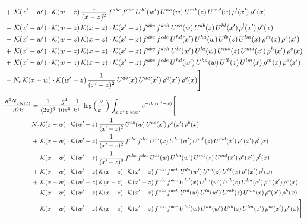 \documentclass[9pt]{article}
\numberwithin{equation}{section}
\begin{document}
\begin{align}
&+\,\mathcal{K}(x'-w')\cdot\mathcal{K}(w-z)\,\frac{1}{(x-z)^{2}}\,f^{abc}\,f^{cde}\,U^{hl}(w')\,U^{ha}(w)\,U^{mb}(z)\,U^{md}(x)\,\rho^{l}(x')\,\rho^{e}(x)\notag\\
&-\,\mathcal{K}(x'-w')\cdot\mathcal{K}(w-z)\,\mathcal{K}(x-z)\cdot\mathcal{K}(x'-z)\,f^{abc}\,f^{deh}\,U^{ea}(w)\,U^{db}(z)\,U^{hl}(x')\,\rho^{l}(x')\,\rho^{c}(x)\notag\\
&-\,\mathcal{K}(x'-w')\cdot\mathcal{K}(w-z)\,\mathcal{K}(x-z)\cdot\mathcal{K}(x'-z)\,f^{abc}\,f^{cde}\,U^{hd}(x')\,U^{ha}(w)\,U^{lb}(z)\,U^{lm}(x)\,\rho^{m}(x)\,\rho^{e}(x')\notag\\
&+\,\mathcal{K}(x'-w')\cdot\mathcal{K}(w-z)\,\mathcal{K}(x-z)\cdot\mathcal{K}(x'-z)\,f^{abc}\,f^{deh}\,U^{le}(w')\,U^{la}(w)\,U^{mb}(z)\,U^{md}(x')\,\rho^{h}(x')\,\rho^{c}(x)\notag\\
&+\,\mathcal{K}(x'-w')\cdot\mathcal{K}(w-z)\,\mathcal{K}(x-z)\cdot\mathcal{K}(x'-z)\,f^{abc}\,f^{cde}\,U^{hd}(w')\,U^{ha}(w)\,U^{lb}(z)\,U^{lm}(x)\,\rho^{m}(x)\,\rho^{e}(x')\notag\\
&-N_{c}\,\mathcal{K}(x-w)\cdot\mathcal{K}(w'-z)\,\frac{1}{(x'-z)^{2}}\,U^{ab}(x)\,U^{ac}(x')\,\rho^{c}(x')\,\rho^{b}(x)\Bigg]
\end{align}
\begin{align}
\frac{d^{3}N_{2\,\rm NLO}^{\rm}}{d^{3}k}  & = \frac{1}{(2\pi)^{3}}\,\frac{g^{4}}{16\pi^{5}}\,\frac{1}{k^{+}}\,\log{\left(\frac{\vee}{k^{+}}\right)}\, \int_{x,x',z,w,w'}e^{-ik\cdot(w'-w)}\Bigg[\notag\\ &    N_{c}\,\mathcal{K}(x-w)\cdot\mathcal{K}(w'-z)\,\frac{1}{(x'-z)^{2}}\,U^{ab}(w)\,U^{ac}(x')\,\rho^{c}(x')\,\rho^{b}(x)\notag\\
&+\,\mathcal{K}(x-w)\cdot\mathcal{K}(w'-z)\,\frac{1}{(x'-z)^{2}}\,f^{abc}\,f^{dce}\,U^{hl}(x)\,U^{ha}(w')\,U^{mb}(z)\,U^{md}(x')\,\rho^{e}(x')\,\rho^{l}(x)\notag\\
&-\,\mathcal{K}(x-w)\cdot\mathcal{K}(w'-z)\,\frac{1}{(x'-z)^{2}}\,f^{abc}\,f^{dce}\,U^{hl}(w)\,U^{ha}(w')\,U^{mb}(z)\,U^{md}(x')\,\rho^{e}(x')\,\rho^{l}(x)\notag\\
&+\,\mathcal{K}(x-w)\cdot\mathcal{K}(w'-z)\,\mathcal{K}(x-z)\cdot\mathcal{K}(x'-z)\,f^{abc}\,f^{deh}\,U^{da}(w')\,U^{eb}(z)\,U^{hl}(x)\,\rho^{c}(x')\,\rho^{l}(x)\notag\\
&+\,\mathcal{K}(x-w)\cdot\mathcal{K}(w'-z)\,\mathcal{K}(x-z)\cdot\mathcal{K}(x'-z)\,f^{abc}\,f^{dce}\,U^{hd}(x)\,U^{ha}(w')\,U^{lb}(z)\,U^{lm}(x')\,\rho^{m}(x')\,\rho^{e}(x)\notag\\
&-\,\mathcal{K}(x-w)\cdot\mathcal{K}(w'-z)\,\mathcal{K}(x-z)\cdot\mathcal{K}(x'-z)\,f^{abc}\,f^{deh}\,U^{ld}(w)\,U^{la}(w')\,U^{mb}(z)\,U^{me}(x)\,\rho^{c}(x')\,\rho^{h}(x)\notag\\
&-\,\mathcal{K}(x-w)\cdot\mathcal{K}(w'-z)\,\mathcal{K}(x-z)\cdot\mathcal{K}(x'-z)\,f^{abc}\,f^{dce}\,U^{hd}(w)\,U^{ha}(w')\,U^{lb}(z)\,U^{lm}(x')\,\rho^{m}(x')\,\rho^{e}(x)\Bigg]
\end{align}
\end{document}

